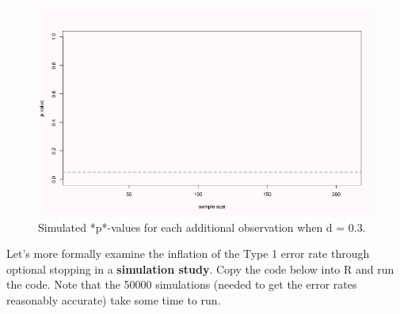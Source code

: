 \documentclass[
  oneside]{book}
\begin{document}
\begin{figure}

{\centering \includegraphics[width=1\linewidth]{images/animatep2} 

}

\caption{Simulated *p*-values for each additional observation when d = 0.3.}\label{fig:animatep2}
\end{figure}

Let's more formally examine the inflation of the Type 1 error rate through optional stopping in a \textbf{simulation study}. Copy the code below into R and run the code. Note that the 50000 simulations (needed to get the error rates reasonably accurate) take some time to run.
\end{document}
